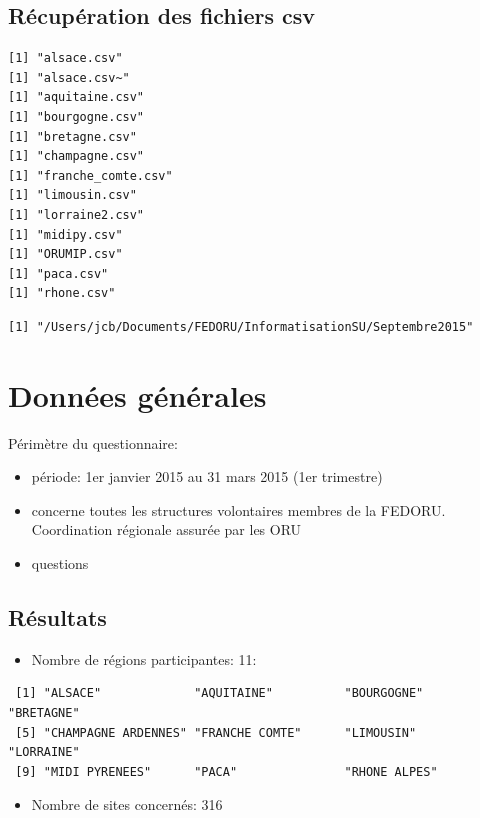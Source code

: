 \documentclass[]{article}
\providecommand{\tightlist}{%
  \setlength{\itemsep}{0pt}\setlength{\parskip}{0pt}}
\begin{document}
\subsection{Récupération des fichiers
csv}\label{recuperation-des-fichiers-csv}

\begin{verbatim}
[1] "alsace.csv"
[1] "alsace.csv~"
[1] "aquitaine.csv"
[1] "bourgogne.csv"
[1] "bretagne.csv"
[1] "champagne.csv"
[1] "franche_comte.csv"
[1] "limousin.csv"
[1] "lorraine2.csv"
[1] "midipy.csv"
[1] "ORUMIP.csv"
[1] "paca.csv"
[1] "rhone.csv"
\end{verbatim}

\begin{verbatim}
[1] "/Users/jcb/Documents/FEDORU/InformatisationSU/Septembre2015"
\end{verbatim}

\section{Données générales}\label{donnees-generales}

Périmètre du questionnaire:

\begin{itemize}
\tightlist
\item
  période: 1er janvier 2015 au 31 mars 2015 (1er trimestre)
\item
  concerne toutes les structures volontaires membres de la FEDORU.
  Coordination régionale assurée par les ORU
\item
  questions
\end{itemize}

\subsection{Résultats}\label{resultats}

\begin{itemize}
\tightlist
\item
  Nombre de régions participantes: 11:
\end{itemize}

\begin{verbatim}
 [1] "ALSACE"             "AQUITAINE"          "BOURGOGNE"          "BRETAGNE"          
 [5] "CHAMPAGNE ARDENNES" "FRANCHE COMTE"      "LIMOUSIN"           "LORRAINE"          
 [9] "MIDI PYRENEES"      "PACA"               "RHONE ALPES"       
\end{verbatim}

\begin{itemize}
\tightlist
\item
  Nombre de sites concernés: 316
\end{itemize}
\end{document}
